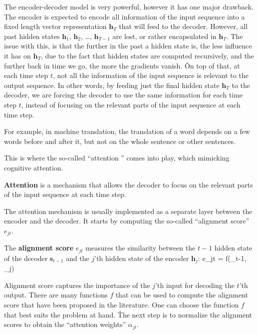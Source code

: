 The encoder-decoder model is very powerful, however it has one major drawback. The encoder is expected to encode all
information of the input sequence into a fixed length vector representation $\boldsymbol{h}_T$ that will feed to the
decoder. However, all past hidden states $\boldsymbol{h}_1$, $\boldsymbol{h}_2$, \ldots, $\boldsymbol{h}_{T-1}$ are
lost, or rather encapsulated in $\boldsymbol{h}_T$. The issue with this, is that the further in the past a hidden
state is, the less influence it has on $\boldsymbol{h}_T$, due to the fact that hidden states are computed
recursively, and the further back in time we go, the more the gradients vanish. \v

On top of that, at each time step $t$, not all the information of the input sequence is relevant to the output sequence.
In other words, by feeding just the final hidden state $\boldsymbol{h}_T$ to the decoder, we are forcing the decoder to
use the same information for each time step $t$, instead of focusing on the relevant parts of the input sequence at each
time step.

\be
For example, in machine translation, the translation of a word depends on a few words before and after it, but not on
the whole sentence or other sentences.
\ee

This is where the so-called ``attention '' comes into play, which mimicking cognitive attention.

\bd[Attention]
\textbf{Attention} is a mechanism that allows the decoder to focus on the relevant parts of the input sequence at each
time step.
\ed

The attention mechanism is usually implemented as a separate layer between the encoder and the decoder. It starts by
computing the so-called ``alignment score'' $e_{jt}$.

The \textbf{alignment score} $e_{jt}$ measures the similarity between the $t-1$ hidden state of the decoder
$\boldsymbol{s}_{t-1}$ and the $j$'th hidden state of the encoder $\boldsymbol{h}_j$:
\bse
e_{jt} = f(_{t-1}, _j)
\ese
\ed

Alignment score captures the importance of the $j$'th input for decoding the $t$'th output. There are many functions
$f$ that can be used to compute the alignment score that have been proposed in the literature. One can choose the
function $f$ that best suits the problem at hand. \v

The next step is to normalize the alignment scores to obtain the ``attention weights'' $\alpha_{jt}$.

